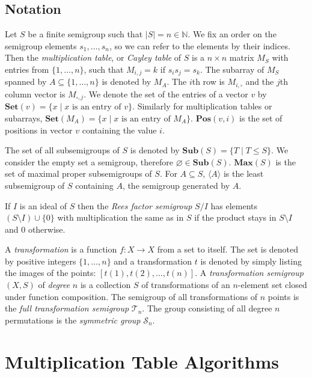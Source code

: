 \documentclass{amsart}
\newcommand{\cT}{{\mathcal T}}
\newcommand{\cS}{{\mathcal S}}
\newcommand{\Sub}{\mathbf{Sub}}
\newcommand{\Set}{\mathbf{Set}}
\newcommand{\Pos}{\mathbf{Pos}}
\newcommand{\Max}{\mathbf{Max}}
\theoremstyle{plain}
\theoremstyle{definition}
\begin{document}
\subsection{Notation}

Let $S$ be a finite semigroup such that $|S|=n\in\mathbb{N}$.
We fix an order on the semigroup elements $s_1,\ldots, s_n$, so we can refer to the elements by their indices. 
Then the  \emph{multiplication table}, or \emph{Cayley table} of $S$ is a $n\times n$ matrix $M_S$ with entries from
$\{1,\ldots,n\}$, such that $M_{i,j}=k$ if $s_is_j=s_k$.
The subarray of $M_S$ spanned by $A\subseteq\{1,\ldots,n\}$ is denoted by $M_A$.
The $i$th row is $M_{i,\square}$  and the $j$th column vector is $M_{\square,j}$.
We denote the set of the entries of a vector $v$ by $\Set(v)=\{x\mid x\text{ is
an entry of } v\}$.  Similarly for multiplication tables or subarrays,
$\Set(M_A)=\{x\mid x\text{ is an entry of } M_A\}$.  $\Pos(v,i)$ is the set of
positions in vector $v$ containing the value $i$.

The set of all subsemigroups of $S$ is denoted by $\Sub(S)=\big\{T\mid T\leq S
\big\}$.  We consider the empty set a semigroup, therefore
$\varnothing\in\Sub(S)$.  $\Max(S)$ is the set of maximal proper subsemigroups
of $S$.  For $A\subseteq S$, $\langle A\rangle$ is the least subsemigroup of $S$
containing $A$, the semigroup generated by $A$. 

If $I$ is an ideal of $S$ then the \emph{Rees factor semigroup} $S/I$ has
elements $(S\setminus I)\cup\{0\}$ with multiplication the same as in $S$ if the
product stays in $S\setminus I$ and 0 otherwise.

A \emph{transformation} is a function $f:X\rightarrow X$ from a set to itself.
The set is denoted by positive integers $\{1,\ldots,n\}$ and a transformation $t$ is denoted by simply listing the images of the points: $[t(1),t(2),\ldots,t(n)]$. 
A \emph{transformation semigroup} $(X,S)$ of \emph{degree} $n$ is a collection $S$ of transformations of an $n$-element set closed under function composition. 
The semigroup of all  transformations of $n$ points is the  \emph{full transformation semigroup} $\cT_n$.
The group  consisting of all degree $n$ permutations is the \emph{symmetric group} $\cS_n$.

\section{Multiplication Table Algorithms}
\label{sec:multab}
\end{document}
